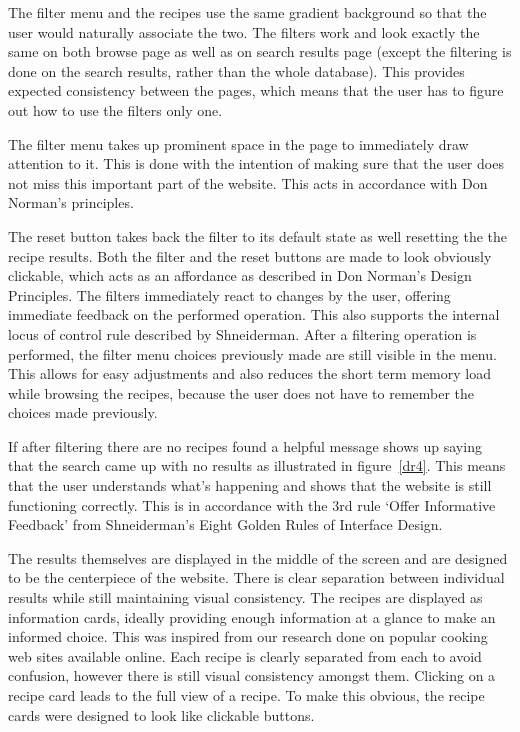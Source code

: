 The filter menu and the recipes use the same gradient background so that the user would naturally associate the two. The filters work and look exactly the same on both browse page as well as on search results page (except the filtering is done on the search results, rather than the whole database). This provides expected consistency between the pages, which means that the user has to figure out how to use the filters only one.

The filter menu takes up prominent space in the page to immediately draw attention to it. This is done with the intention of making sure that the user does not miss this important part of the website. This acts in accordance with Don Norman’s principles.

The reset button takes back the filter to its default state as well resetting the the recipe results. Both the filter and the reset buttons are made to look obviously clickable, which acts as an affordance as described in Don Norman’s Design Principles. The filters immediately react to changes by the user, offering immediate feedback on the performed operation. This also supports the internal locus of control rule described by Shneiderman. After a filtering operation is performed, the filter menu choices previously made are still visible in the menu. This allows for easy adjustments and also reduces the short term memory load while browsing the recipes, because the user does not have to remember the choices made previously.

If after filtering there are no recipes found a helpful message shows up saying that the search came up with no results as illustrated in figure~\ref{dr4}. This means that the user understands what’s happening and shows that the website is still functioning correctly. This is in accordance with the 3rd rule ‘Offer Informative Feedback’ from  Shneiderman’s Eight Golden Rules of Interface Design. 

The results themselves are displayed in the middle of the screen and are designed to be the centerpiece of the website. There is clear separation between individual results while still maintaining visual consistency. The recipes are displayed as information cards, ideally providing enough information at a glance to make an informed choice. This was inspired from our research done on popular cooking web sites available online. Each recipe is clearly separated from each to avoid confusion, however there is still visual consistency amongst them. Clicking on a recipe card leads to the full view of a recipe. To make this obvious, the recipe cards were designed to look like clickable buttons.